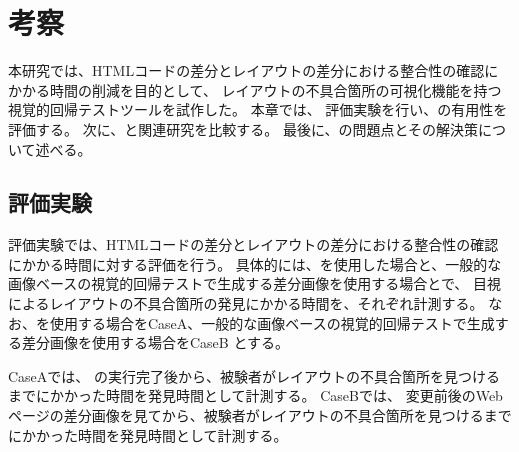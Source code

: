 \chapter{考察}\label{cha:Discussion}
本研究では、HTMLコードの差分とレイアウトの差分における整合性の確認にかかる時間の削減を目的として、
レイアウトの不具合箇所の可視化機能を持つ視覚的回帰テストツール\toolName を試作した。
本章では、
評価実験を行い、\toolName の有用性を評価する。
次に、\toolName と関連研究を比較する。
最後に、\toolName の問題点とその解決策について述べる。

\section{評価実験}
評価実験では、HTMLコードの差分とレイアウトの差分における整合性の確認にかかる時間に対する評価を行う。
具体的には、\toolName を使用した場合と、一般的な画像ベースの視覚的回帰テストで生成する差分画像を使用する場合とで、
目視によるレイアウトの不具合箇所の発見にかかる時間を、それぞれ計測する。
なお、\toolName を使用する場合をCaseA、一般的な画像ベースの視覚的回帰テストで生成する差分画像を使用する場合をCaseB
とする。

CaseAでは、
\toolName の実行完了後から、被験者がレイアウトの不具合箇所を見つけるまでにかかった時間を発見時間として計測する。
CaseBでは、
変更前後のWebページの差分画像を見てから、被験者がレイアウトの不具合箇所を見つけるまでにかかった時間を発見時間として計測する。


